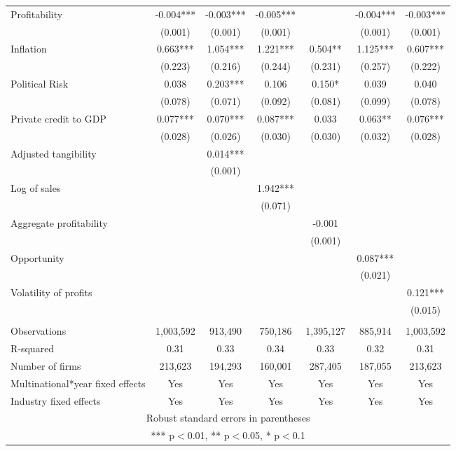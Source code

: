 \begin{tabular}{lcccccc}
Profitability & -0.004*** & -0.003*** & -0.005*** &  & -0.004*** & -0.003*** \\
 & (0.001) & (0.001) & (0.001) &  & (0.001) & (0.001) \\
Inflation & 0.663*** & 1.054*** & 1.221*** & 0.504** & 1.125*** & 0.607*** \\
 & (0.223) & (0.216) & (0.244) & (0.231) & (0.257) & (0.222) \\
Political Risk & 0.038 & 0.203*** & 0.106 & 0.150* & 0.039 & 0.040 \\
 & (0.078) & (0.071) & (0.092) & (0.081) & (0.099) & (0.078) \\
Private credit to GDP & 0.077*** & 0.070*** & 0.087*** & 0.033 & 0.063** & 0.076*** \\
 & (0.028) & (0.026) & (0.030) & (0.030) & (0.032) & (0.028) \\
Adjusted tangibility &  & 0.014*** &  &  &  &  \\
 &  & (0.001) &  &  &  &  \\
Log of sales &  &  & 1.942*** &  &  &  \\
 &  &  & (0.071) &  &  &  \\
Aggregate profitability &  &  &  & -0.001 &  &  \\
 &  &  &  & (0.001) &  &  \\
Opportunity &  &  &  &  & 0.087*** &  \\
 &  &  &  &  & (0.021) &  \\
Volatility of profits &  &  &  &  &  & 0.121*** \\
 &  &  &  &  &  & (0.015) \\
 &  &  &  &  &  &  \\
Observations & 1,003,592 & 913,490 & 750,186 & 1,395,127 & 885,914 & 1,003,592 \\
R-squared & 0.31 & 0.33 & 0.34 & 0.33 & 0.32 & 0.31 \\
Number of firms & 213,623 & 194,293 & 160,001 & 287,405 & 187,055 & 213,623 \\
Multinational*year fixed effects & Yes & Yes & Yes & Yes & Yes & Yes \\
 Industry fixed effects & Yes & Yes & Yes & Yes & Yes & Yes \\ \hline
\multicolumn{7}{c}{ Robust standard errors in parentheses} \\
\multicolumn{7}{c}{ *** p$<$0.01, ** p$<$0.05, * p$<$0.1} \\
\end{tabular}
